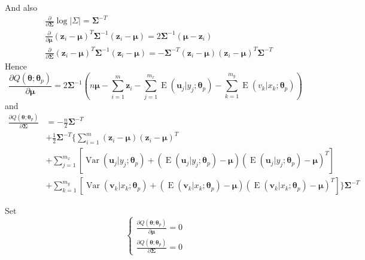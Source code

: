 \documentclass{article}
\DeclareMathOperator{\Var}{Var}
\DeclareMathOperator{\E}{E}
\begin{document}
\begin{enumerate}[font = \bfseries, leftmargin = 0 em]
	And also
	\begin{align*}
	& \frac{\partial}{\partial \bm \Sigma} \log|\Sigma| = \bm \Sigma^{-T}\\
	& \frac{\partial}{\partial \bm \mu}(\bm z_i - \bm \mu)^T \bm \Sigma^{-1} (\bm z_i - \bm \mu) = 2 \bm \Sigma^{-1} (\bm \mu - \bm z_i)\\
	& \frac{\partial}{\partial \bm \Sigma}(\bm z_i - \bm \mu)^T \bm \Sigma^{-1}(\bm z_i - \bm \mu) = - \bm \Sigma^{-T}(\bm z_i - \bm \mu)(\bm z_i - \bm \mu)^T \bm \Sigma^{-T}
	\end{align*}
	Hence
	\[\frac{\partial Q(\bm \theta; \bm \theta_p)}{\partial \bm \mu} = 2 \bm \Sigma^{-1}\left(n \bm \mu - \sum_{i=1}^m \bm z_i - \sum_{j = 1}^{m_x}\E(\bm u_j|y_j; \bm \theta_p) - \sum_{k=1}^{m_y} \E(v_k|x_k; \bm \theta_p)\right)\]
	and
	\begin{align*}
	\frac{\partial Q(\bm \theta; \bm \theta_p)}{\partial \bm \Sigma} & = -\frac{n}{2} \bm \Sigma^{-T}\\
	& + \frac{1}{2} \bm \Sigma^{-T}\bigg\{ \sum_{i=1}^m (\bm z_i - \bm \mu)(\bm z_i - \bm \mu)^T\\
	& + \sum_{j=1}^{m_x}\left[\Var(\bm u_j|y_j; \bm \theta_p) + \left(\E(\bm u_j|y_j; \bm \theta_p) - \bm \mu\right)\left(\E(\bm u_j|y_j; \bm \theta_p) - \bm \mu\right)^T\right]\\
	& + \sum_{k=1}^{m_y}\left[\Var(\bm v_k|x_k; \bm \theta_p) + \left(\E(\bm v_k|x_k; \bm \theta_p) - \bm \mu\right)\left(\E(\bm v_k|x_k; \bm \theta_p) - \bm \mu\right)^T\right]\bigg\} \bm \Sigma^{-T}
	\end{align*}
	
	
	Set 
	\[\begin{cases}
		\frac{\partial Q(\bm \theta; \bm \theta_p)}{\partial \bm \mu} = 0\\
		\frac{\partial Q(\bm \theta; \bm \theta_p)}{\partial \bm \Sigma} = 0
	\end{cases}\]


\end{enumerate}
\end{document}
